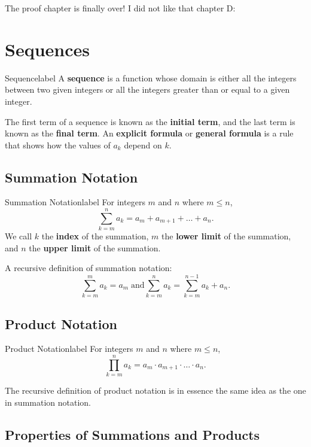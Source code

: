 \documentclass[a4paper]{report}
\begin{document}
The proof chapter is finally over! I did not like that chapter D:

\section{Sequences}

\begin{definition}{Sequence}{label}
    A \textbf{sequence} is a function whose domain is either all the integers between two given
    integers or all the integers greater than or equal to a given integer.
\end{definition}

The first term of a sequence is known as the \textbf{initial term}, and the last term is known as
the \textbf{final term}. An \textbf{explicit formula} or \textbf{general formula} is a rule
that shows how the values of $a_k$ depend on $k$.

\subsection{Summation Notation}

\begin{definition}{Summation Notation}{label}
    For integers $m$ and $n$ where $m \le n$, \[
        \sum_{k=m}^{n} a_k = a_m + a_{m+1} + \ldots + a_n
    .\] 
    We call $k$ the \textbf{index} of the summation, $m$ the \textbf{lower limit} of the summation,
    and $n$ the \textbf{upper limit} of the summation.
    
    A recursive definition of summation notation: \[
        \sum_{k=m}^{m} a_k = a_m \; \text{and} \sum_{k=m}^{n} a_k = \sum_{k=m}^{n-1} a_k + a_n
    .\] 
\end{definition}

\subsection{Product Notation}

\begin{definition}{Product Notation}{label}
    For integers $m$ and $n$ where $m \le n$, \[
        \prod_{k=m}^{n} a_k = a_m \cdot a_{m+1} \cdot \ldots \cdot a_n
    .\] 
    
    The recursive definition of product notation is in essence the same idea as the one in summation
    notation.
\end{definition}

\subsection{Properties of Summations and Products}
\end{document}
